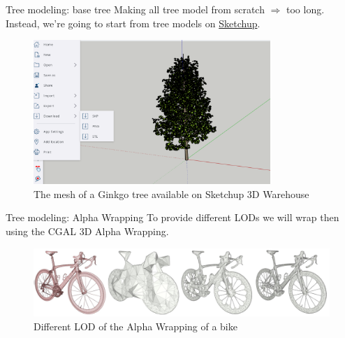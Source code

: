 \documentclass[10pt]{beamer}
\begin{document}
\begin{frame}{Tree modeling: base tree}
Making all tree model from scratch $\Longrightarrow$ too long. \\
Instead, we're going to start from tree models on \href{https://app.sketchup.com/app}{Sketchup}.

\begin{figure}[H]
    \centering
        \centering
        \includegraphics[width=0.8\textwidth]{images/ginkgo_sketchup.png}
        \caption{The mesh of a Ginkgo tree available on Sketchup 3D Warehouse}
\end{figure}
\end{frame}

\begin{frame}{Tree modeling: Alpha Wrapping}
  To provide different LODs we will wrap then using the CGAL 3D 
  Alpha Wrapping\cite{cgal_alpha_wrapper}.

  \begin{figure}[H]
    \centering
        \centering
        \includegraphics[width=\textwidth]{images/aw3_bike_lod.jpg}
        \caption{Different LOD of the Alpha Wrapping of a bike}
\end{figure}
\end{frame}
\end{document}
